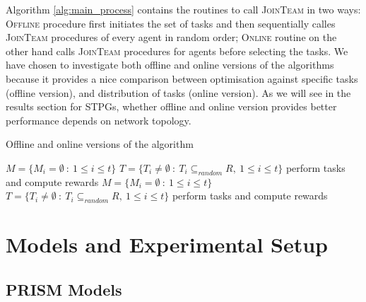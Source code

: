 \documentclass{llncs}
\newcommand{\comment}[1]{{\color{red}{[\sf #1]}}}
\begin{document}
Algorithm \ref{alg:main_process} contains the routines to call \textsc{JoinTeam} in two ways: \textsc{Offline} procedure first initiates the set of tasks and then sequentially calles \textsc{JoinTeam} procedures of every agent in random order; \textsc{Online} routine on the other hand calls \textsc{JoinTeam} procedures for agents before selecting the tasks. We have chosen to investigate both offline and online versions of the algorithms because it provides a nice comparison between optimisation against specific tasks (offline version), and distribution of tasks (online version). As we will see in the results section for STPGs, whether offline and online version provides better performance depends on network topology.


\begin{algorithm}[H]
\caption{Offline and online versions of the algorithm}
\label{alg:main_process}
\begin{scriptsize}
\begin{algorithmic}
 
  \State $M = \{M_i = \emptyset\ :\ 1\leq i \leq t\}$ 
  \State $T = \{T_i\neq \emptyset\ :\ T_i \subseteq_{random} R,\ 1\leq i \leq t\}$ 
    \State {}
  \EndFor
  \State perform tasks and compute rewards
\EndProcedure
\Statex
{} 
  \State $M = \{M_i = \emptyset\ :\ 1\leq i \leq t\}$ 
    \State {}
  \EndFor
  \State $T = \{T_i\neq \emptyset\ :\ T_i \subseteq_{random} R,\ 1\leq i \leq t\}$ 
  \State perform tasks and compute rewards
\EndProcedure
\end{algorithmic}
\end{scriptsize}
\end{algorithm}

\section{Models and Experimental Setup}

\subsection{PRISM Models}

\comment{give a small example of PRISM models and explain DTMC, MDP and STPG}
\end{document}
